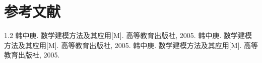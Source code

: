 \section{参考文献}
\begin{thebibliography}{1.2}%
\setlength{\itemsep}{-2mm}
 韩中庚. 数学建模方法及其应用[M]. 高等教育出版社, 2005.
 韩中庚. 数学建模方法及其应用[M]. 高等教育出版社, 2005.
 韩中庚. 数学建模方法及其应用[M]. 高等教育出版社, 2005.
\end{thebibliography}
